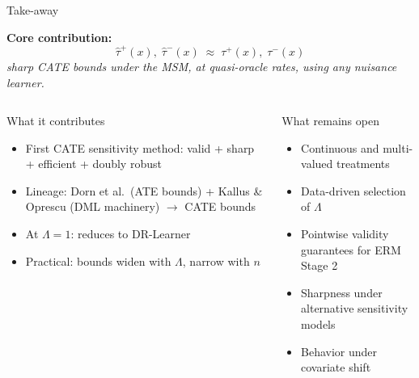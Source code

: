 \documentclass[aspectratio=169]{beamer}
\begin{document}

\begin{frame}{Take-away}

\textbf{Core contribution:}
\[
  \hat\tau^+(x),\; \hat\tau^-(x) \;\approx\; \tau^+(x),\; \tau^-(x)
\]
\textit{sharp CATE bounds under the MSM, at quasi-oracle rates, using any nuisance learner.}

\medskip
\begin{columns}
\begin{block}{What it contributes}
\begin{itemize}\small
  \item First CATE sensitivity method: valid + sharp + efficient + doubly robust
  \item Lineage: Dorn et al.\ (ATE bounds) + Kallus \& Oprescu (DML machinery) $\to$ CATE bounds
  \item At $\Lambda=1$: reduces to DR-Learner
  \item Practical: bounds widen with $\Lambda$, narrow with $n$
\end{itemize}
\end{block}

\begin{alertblock}{What remains open}
\begin{itemize}\small
  \item Continuous and multi-valued treatments
  \item Data-driven selection of $\Lambda$
  \item Pointwise validity guarantees for ERM Stage 2
  \item Sharpness under alternative sensitivity models
  \item Behavior under covariate shift
\end{itemize}
\end{alertblock}
\end{columns}
\end{frame}
\end{document}
